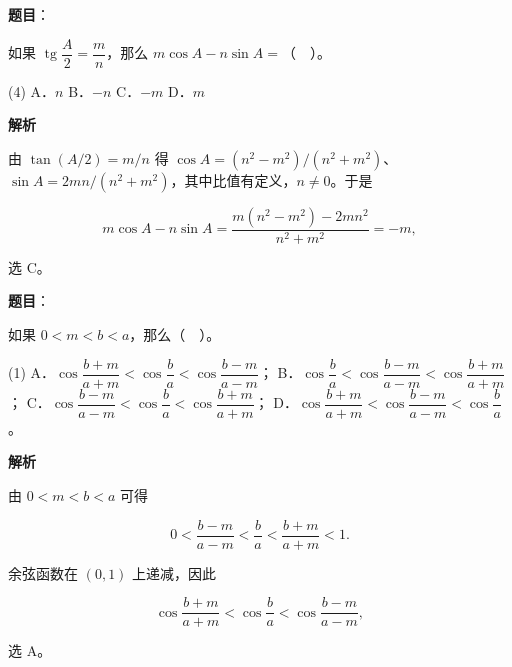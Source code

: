\begin{answer}

\textbf{题目}：

如果 $\operatorname{tg}\dfrac A2=\dfrac mn$，那么 $m\cos A-n\sin A=$（　）。

\begin{gkopts}(4)
\task A．$n$
\task B．$-n$
\task C．$-m$
\task D．$m$
\end{gkopts}

\textbf{解析}

由 $\tan(A/2)=m/n$ 得 $\cos A=(n^2-m^2)/(n^2+m^2)$、$\sin A=2mn/(n^2+m^2)$，其中比值有定义，$n\ne0$。于是

\nopagebreak[4]
\[m\cos A-n\sin A=\frac{m(n^2-m^2)-2mn^2}{n^2+m^2}=-m,\]

选 C。


\end{answer}
\begin{answer}

\textbf{题目}：

如果 $0<m<b<a$，那么（　）。

\begin{gkopts}(1)
\task A．$\cos\dfrac{b+m}{a+m}<\cos\dfrac ba<\cos\dfrac{b-m}{a-m}$；
\task B．$\cos\dfrac ba<\cos\dfrac{b-m}{a-m}<\cos\dfrac{b+m}{a+m}$；
\task C．$\cos\dfrac{b-m}{a-m}<\cos\dfrac ba<\cos\dfrac{b+m}{a+m}$；
\task D．$\cos\dfrac{b+m}{a+m}<\cos\dfrac{b-m}{a-m}<\cos\dfrac ba$。
\end{gkopts}

\textbf{解析}

由 $0<m<b<a$ 可得

\nopagebreak[4]
\[0<\frac{b-m}{a-m}<\frac ba<\frac{b+m}{a+m}<1.\]

余弦函数在 $(0,1)$ 上递减，因此

\nopagebreak[4]
\[\cos\frac{b+m}{a+m}<\cos\frac ba<\cos\frac{b-m}{a-m},\]

选 A。


\end{answer}
